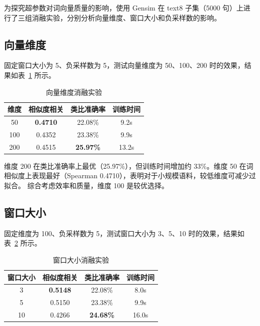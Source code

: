 为探究超参数对词向量质量的影响，使用 Gensim 在 text8 子集（5000 句）上进行了三组消融实验，分别分析向量维度、窗口大小和负采样数的影响。

\subsection{向量维度}

固定窗口大小为 5、负采样数为 5，测试向量维度为 50、100、200 时的效果，结果如表~\ref{tab:ablation_dim} 所示。

\begin{table}[htbp]
\centering
\caption{向量维度消融实验}
\label{tab:ablation_dim}
\begin{tabular}{cccc}
\toprule
\textbf{维度} & \textbf{相似度相关} & \textbf{类比准确率} & \textbf{训练时间} \\
\midrule
50 & \textbf{0.4710} & 22.08\% & 9.2s \\
100 & 0.4352 & 23.38\% & 9.9s \\
200 & 0.4515 & \textbf{25.97\%} & 13.2s \\
\bottomrule
\end{tabular}
\end{table}

维度 200 在类比准确率上最优（25.97\%），但训练时间增加约 33\%。维度 50 在词相似度上表现最好（Spearman 0.4710），表明对于小规模语料，较低维度可减少过拟合。
综合考虑效率和质量，维度 100 是较优选择。

\subsection{窗口大小}

固定维度为 100、负采样数为 5，测试窗口大小为 3、5、10 时的效果，结果如表~\ref{tab:ablation_window} 所示。

\begin{table}[htbp]
\centering
\caption{窗口大小消融实验}
\label{tab:ablation_window}
\begin{tabular}{cccc}
\toprule
\textbf{窗口大小} & \textbf{相似度相关} & \textbf{类比准确率} & \textbf{训练时间} \\
\midrule
3 & \textbf{0.5148} & 22.08\% & 8.0s \\
5 & 0.5150 & 23.38\% & 9.9s \\
10 & 0.4266 & \textbf{24.68\%} & 16.0s \\
\bottomrule
\end{tabular}
\end{table}

